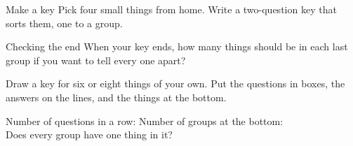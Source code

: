 \begin{puzzle}{Make a key}
Pick four small things from home. Write a two-question key that sorts them, one to a group. \wline[7cm]
\end{puzzle}

\begin{puzzle}{Checking the end}
When your key ends, how many things should be in each last group if you want to tell every one apart? \wline[2cm]
\end{puzzle}
\clearpage

\thispagestyle{fancy}
Draw a key for six or eight things of your own. Put the questions in boxes, the answers on the lines, and the things at the bottom.\par\medskip
\begin{center}\end{center}
Number of questions in a row: \wline[1.6cm] \quad Number of groups at the bottom: \wline[1.6cm]\\[10pt]
Does every group have one thing in it? \wline[2cm]
\clearpage
